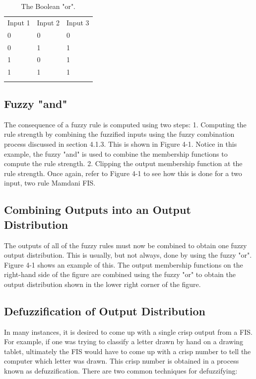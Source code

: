 \begin{table}
\small
\caption{The Boolean "or".}
\label{tab:boolean_or} 
\centering
\small
\begin{tabular}{p{3cm} p{3cm} p{3cm} }
\hline\noalign{\smallskip}
 Input 1 & Input 2 & Input 3 \\
\noalign{\smallskip}\hline\noalign{\smallskip}
\small{0} & \small{0} & \small{0}\\ \hline  
\small{0} & \small{1} & \small{1}\\ \hline  
\small{1} & \small{0} & \small{1}\\ \hline  
\small{1} & \small{1} & \small{1}\\ \hline  
\noalign{\smallskip}\hline
\end{tabular}
\end{table}

\subsection{Fuzzy "and"}

The consequence of a fuzzy rule is computed using two steps: 1. Computing the
rule strength by combining the fuzzified inputs using the fuzzy combination
process discussed in section 4.1.3. This is shown in Figure 4-1. Notice in this
example, the fuzzy "and" is used to combine the membership functions to compute
the rule strength. 2. Clipping the output membership function at the rule
strength. Once again, refer to Figure 4-1 to see how this is done for a two
input, two rule Mamdani FIS.

\subsection{Combining Outputs into an Output Distribution} 
The outputs of all of
the fuzzy rules must now be combined to obtain one fuzzy output distribution.
This is usually, but not always, done by using the fuzzy "or". Figure 4-1 shows
an example of this. The output membership functions on the right-hand side of
the figure are combined using the fuzzy "or" to obtain the output distribution
shown in the lower right corner of the figure.

\subsection{Defuzzification of Output Distribution} 

In many instances, it is desired to come up with a single crisp output from a
FIS. For example, if one was trying to classify a letter drawn by hand on a
drawing tablet, ultimately the FIS would have to come up with a crisp number to
tell the computer which letter was drawn. This crisp number is obtained in a
process known as defuzzification. There are two common techniques for
defuzzifying:


